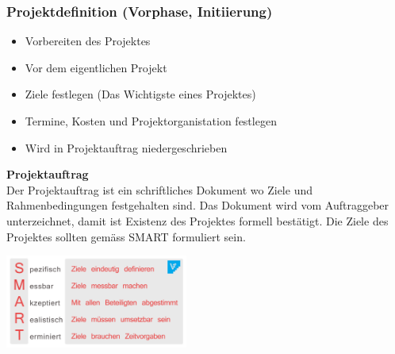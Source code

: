 \subsubsection{Projektdefinition (Vorphase, Initiierung)}
\begin{itemize}
	\item Vorbereiten des Projektes
	\item Vor dem eigentlichen Projekt
	\item Ziele festlegen (Das Wichtigste eines Projektes)
	\item Termine, Kosten und Projektorganistation festlegen
	\item Wird in Projektauftrag niedergeschrieben
\end{itemize}
	\begin{minipage}{11cm}
		\textbf{Projektauftrag} \\
		Der Projektauftrag ist ein schriftliches Dokument wo Ziele und Rahmenbedingungen festgehalten sind. Das Dokument wird vom Auftraggeber unterzeichnet, damit ist Existenz des Projektes formell bestätigt. Die Ziele des Projektes sollten gemäss SMART formuliert sein. 
	\end{minipage}
	\begin{minipage}{6cm}
		\includegraphics[width=6cm]{images/smart.png}
	\end{minipage}
	
